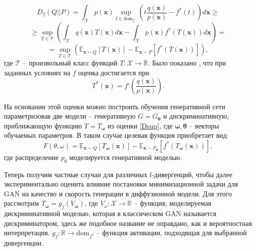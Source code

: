 \documentclass{article}
\begin{document}
\begin{equation}
	D_f(Q||P) = \int_\mathcal{X} p(\mathbf{x})  
	\sup\limits_{t\in \text{dom}_{f^*}} \left( t\frac{q(\mathbf{x})}{p(\mathbf{x})}-f^*(t) \right) d\mathbf{x}
	\geqslant
\end{equation}
\begin{equation}
		\geqslant\sup\limits_{T \in \mathcal{T}}\left(\int _\mathcal{X}q(\mathbf{x})T(\mathbf{x})d\mathbf{x} -  \int _\mathcal{X}p(\mathbf{x})f^*(T(\mathbf{x}))d\mathbf{x} \right) = 
\end{equation}
\begin{equation}
	= \sup\limits_{T \in \mathcal{T}}\left(\mathbb{E}_{\mathbf{x}\sim Q} [T(\mathbf{x})] - \mathbb{E}_{\mathbf{\mathbf{x}}\sim P} [f^*(T(\mathbf{x}))] \right),
		\label{Dsup} 
\end{equation}
где $\mathcal{T}$ -- произвольный класс функций $T:\mathcal{X} \to \mathbb{R}$. Было показано \cite{Nguyen_2010}, что при заданных условиях на $f$ оценка достигается при 
\begin{equation}
	T^*(\mathbf{x}) = f'\left(\frac{q(\mathbf{x})}{p(\mathbf{x})}\right).
\end{equation}

На основании этой оценки можно построить обучения генеративной сети параметризовав две модели -- генеративную $G = G_\mathbf{\theta}$ и дискриминативную, приближающую функцию $T = T_\mathbf{\omega}$ из оценки \ref{Dsup}, где $\mathbf{\omega}, \mathbf{\theta}$ -- векторы обучаемых параметров. В таком случае целевая функция приобретает вид:
\begin{equation}
F(\theta, \omega) = \mathbb{E}_{\mathbf{x}\sim Q} [T_\mathbf{\omega}(\mathbf{x})] - \mathbb{E}_{ \mathbf{\mathbf{x}}\sim P_\mathbf{\theta}}[f^*(T_\mathbf{\omega}(\mathbf{x}))],
\end{equation}
где распределение $p_\theta$ моделируется генеративной моделью.

Теперь получим частные случаи для различных f-дивергенций, чтобы далее экспериментально оценить влияние постановки минимизационной задачи для GAN на качество и скорость генерации в диффузионной модели.
Для этого рассмотрим $T_\mathbf{\omega} = g_f(V_\mathbf{\omega})$, где $V_\omega : \mathcal{X} \to \mathbb{R}$ -- функция, моделируемая дискриминативной моделью, которая в классическом GAN называется дискриминатором, здесь же подобное название не оправдано, как и вероятностная интерпретация. $g_f: \mathbb{R} \to \text{dom}_{f^*}$ -- функция активации, подходящая для выбранной дивергенции.
\end{document}
